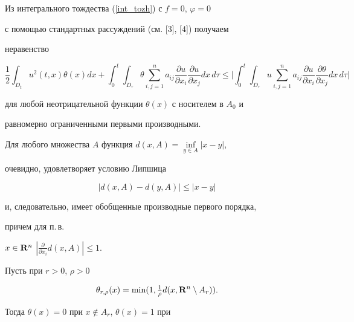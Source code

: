 \begin{pf} 


Из интегрального тождества (\ref{int_tozh}) с $f=0$, $\varphi=0$


с помощью стандартных рассуждений (см. [3], [4]) получаем


неравенство


\begin{equation}


\label{3.10}


\frac{1}{2} \int_{D_t}u^2(t,x)\theta(x)dx +


\int_0^t\int_{D_\tau} \theta \sum_{i,j=1}^n a_{ij}


\frac{\partial u}{\partial x_i}


\frac{\partial u}{\partial x_j}dx\,d\tau \leq


\bigg| \int_0^t \int_{D_\tau} 


u \sum_{i,j=1}^n a_{ij}


\frac{\partial u}{\partial x_i}


\frac{\partial \theta}{\partial x_j}dx\,d\tau \bigg|


\end{equation}


для любой неотрицательной функции $\theta(x)$ с носителем в ${A}_0$ и


равномерно ограниченными первыми производными.





Для любого множества ${A}$ функция $d(x,{A})=\inf\limits_{y\in {A}}|x-y|$,


очевидно, удовлетворяет условию Липшица


$$


|d(x,{A})-d(y,{A})|\leq |x-y|


$$


и, следовательно, имеет обобщенные производные первого порядка,


причем для п.\,в.


$x\in {\bold R}^n$\; $|\frac{\partial }{\partial x_i} d(x,{A})|\leq 1$.





Пусть при $r>0$, $\rho>0$


$$


\theta_{r,\rho}(x)=\min (1,\tfrac{1}{\rho}d(x,{\bold R}^n\setminus {A}_r)).


$$


Тогда $\theta(x)=0$ при $x\notin {A}_r$, $\theta(x)=1$ при



\end{pf}
